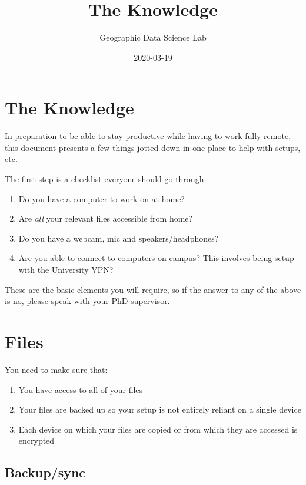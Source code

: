 \documentclass[]{book}
\title{The Knowledge}
\author{Geographic Data Science Lab}
\date{2020-03-19}
\providecommand{\tightlist}{%
  \setlength{\itemsep}{0pt}\setlength{\parskip}{0pt}}
\begin{document}
\maketitle

{
\setcounter{tocdepth}{1}
\tableofcontents
}
\chapter{The Knowledge}\label{the-knowledge}

In preparation to be able to stay productive while having to work fully
remote, this document presents a few things jotted down in one place to
help with setups, etc.

The first step is a checklist everyone should go through:

\begin{enumerate}
\def\labelenumi{\arabic{enumi}.}
\tightlist
\item
  Do you have a computer to work on at home?
\item
  Are \emph{all} your relevant files accessible from home?
\item
  Do you have a webcam, mic and speakers/headphones?
\item
  Are you able to connect to computers on campus? This involves being
  setup with the University VPN?
\end{enumerate}

These are the basic elements you will require, so if the answer to any
of the above is no, please speak with your PhD supervisor.

\chapter{Files}\label{files}

You need to make sure that:

\begin{enumerate}
\def\labelenumi{\alph{enumi})}
\tightlist
\item
  You have access to all of your files
\item
  Your files are backed up so your setup is not entirely reliant on a
  single device
\item
  Each device on which your files are copied or from which they are
  accessed is encrypted
\end{enumerate}

\section{Backup/sync}\label{backupsync}
\end{document}
